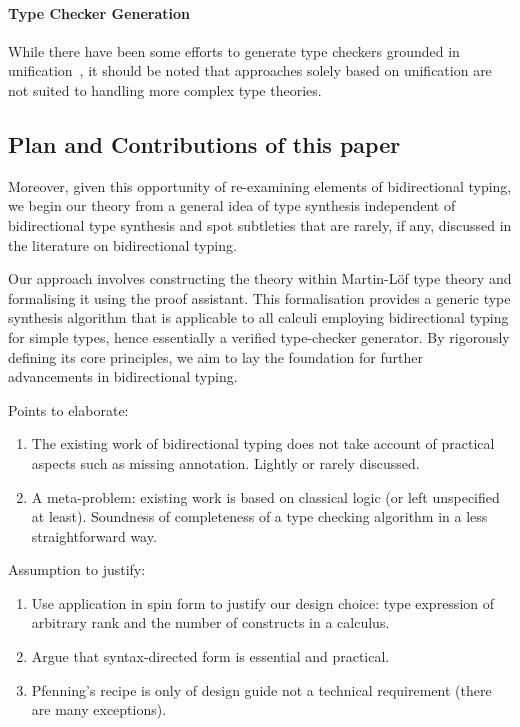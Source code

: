 \paragraph{Type Checker Generation}
While there have been some efforts to generate type checkers grounded in unification~\citep{Gast2004,Grewe2015}, it should be noted that approaches solely based on unification are not suited to handling more complex type theories.

\subsection{Plan and Contributions of this paper}

Moreover, given this opportunity of re-examining elements of bidirectional typing, we begin our theory from a general idea of type synthesis independent of bidirectional type synthesis and spot subtleties that are rarely, if any, discussed in the literature on bidirectional typing. 

Our approach involves constructing the theory within Martin-L\"of type theory and formalising it using the \Agda proof assistant.
This formalisation provides a generic type synthesis algorithm that is applicable to all calculi employing bidirectional typing for simple types, hence essentially a verified type-checker generator.
By rigorously defining its core principles, we aim to lay the foundation for further advancements in bidirectional typing.



Points to elaborate:
\begin{enumerate}
  \item The existing work of bidirectional typing does not take account of practical aspects such as missing annotation.
    Lightly or rarely discussed.
  \item A meta-problem: existing work is based on classical logic (or left unspecified at least).
    Soundness of completeness of a type checking algorithm in a less straightforward way.
\end{enumerate}
Assumption to justify:
\begin{enumerate}
  \item Use application in spin form to justify our design choice: type expression of arbitrary rank and the number of constructs in a calculus.
  \item Argue that syntax-directed form is essential and practical.
  \item Pfenning's recipe is only of design guide not a technical requirement (there are many exceptions).
\end{enumerate}

